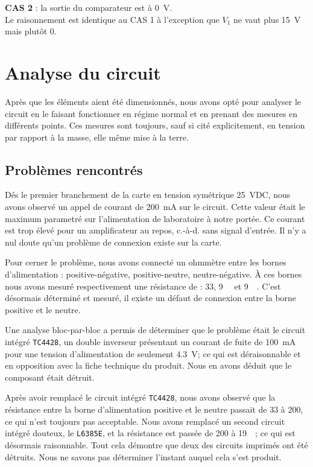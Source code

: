 \documentclass[10pt, oneside, a4paper]{article}
\begin{document}
\noindent\textbf{CAS 2} : la sortie du comparateur est à \SI{0}{\volt}. \\
Le raisonnement est identique au CAS 1 à l'exception que $V_1$ ne vaut plus \SI{15}{\volt} mais plutôt 0.



\section{Analyse du circuit}
Après que les éléments aient été dimensionnés, nous avons opté pour analyser le circuit en le faisant fonctionner en régime normal et en prenant des mesures en différents points.
Ces mesures sont toujours, sauf si cité explicitement, en tension par rapport à la masse, elle même mise à la terre.

\subsection{Problèmes rencontrés}
\label{sec:problems}
Dés le premier branchement de la carte en tension symétrique \pm\SI{25}{\volt}DC,
nous avons observé un appel de courant de \SI{200}{\milli\ampere} sur le circuit.
Cette valeur était le maximum parametré sur l'alimentation de laboratoire à notre portée.
Ce courant est trop élevé pour un amplificateur au repos, c.-à-d. sans signal d'entrée.
Il n'y a nul doute qu'un problème de connexion existe sur la carte.

Pour cerner le problème, nous avons connecté un ohmmètre entre les bornes d'alimentation : positive-négative, positive-neutre, neutre-négative.
À ces bornes nous avons mesuré respectivement une résistance de : \SI{33}{\Omega}, \SI{9}{\kilo\Omega} et \SI{9}{\kilo\Omega}.
C'est désormais déterminé et mesuré, il existe un défaut de connexion entre la borne positive et le neutre.

Une analyse bloc-par-bloc a permis de déterminer que le problème était le circuit intégré \texttt{TC4428}, un double inverseur présentant un courant de fuite de \SI{100}{\milli\ampere} pour une tension d'alimentation de seulement \SI{4.3}{\volt};
ce qui est déraisonnable et en opposition avec la fiche technique du produit.
Nous en avons déduit que le composant était détruit.

Après avoir remplacé le circuit intégré \texttt{TC4428}, nous avons observé que la résistance entre la borne d'alimentation positive et le neutre passait de \SI{33}{\Omega} à \SI{200}{\Omega}, ce qui n'est toujours pas acceptable.
Nous avons remplacé un second circuit intégré douteux, le \verb|L6385E|, et la résistance est passée de \SI{200}{\Omega} à \SI{19}{\kilo\Omega}; ce qui est désormais raisonnable.
Tout cela démontre que deux des circuits imprimés ont été détruits.
Nous ne savons pas déterminer l'instant auquel cela s'est produit.
\end{document}
